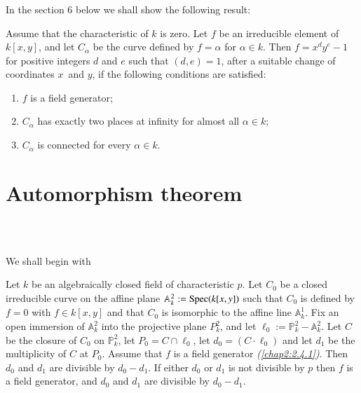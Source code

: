 \subsubsection{}\label{chap2:2.4.6}
In the section 6 below we shall show the following result:

Assume that the characteristic of $k$ is zero. Let $f$ be an
irreducible element of $k[x,y]$, and let $C_{\alpha}$ be the curve
defined by $f=\alpha$ for $\alpha\in k$. Then $f=x^{d}y^{e}-1$ for
positive integers $d$ and $e$ such that $(d,e)=1$, after a suitable
change of coordinates $x$\pageoriginale\ and $y$, if the following
conditions are satisfied:
\begin{enumerate}
\renewcommand{\labelenumi}{\theenumi$^{\circ}$}
\item $f$ is a field generator;

\item $C_{\alpha}$ has exactly two places at infinity for almost all
  $\alpha\in k$;

\item $C_{\alpha}$ is connected for every $\alpha\in k$.
\end{enumerate}

\section{Automorphism theorem}\label{chap2:sec3}\pageoriginale\

\subsection{}\label{chap2:3.1}
We shall begin with 

\begin{lemma*}[\cf Nagata {[43; p.\@ 21]} ]
Let $k$ be an algebraically closed field of characteristic $p$. Let
$C_{0}$ be a closed irreducible curve on the affine plane
$\mathbb{A}^{2}_{k}:=\operatorname{Spec}(k[x,y])$ such that $C_{0}$ is defined by
$f=0$ with $f\in k[x,y]$ and that $C_{0}$ is isomorphic to the affine
line $\mathbb{A}^{1}_{k}$. Fix an open immersion of
$\mathbb{A}^{2}_{k}$ into the projective plane $P^{2}_{k}$, and let
$\ell_{0}:=\mathbb{P}^{2}_{k}-\mathbb{A}^{2}_{k}$. Let $C$ be the
closure of $C_{0}$ on $\mathbb{P}^{2}_{k}$, let $P_{0}=C\cap
\ell_{0}$, let $d_{0}=(C\cdot\ell_{0})$ and let $d_{1}$ be the
multiplicity of $C$ at $P_{0}$. Assume that $f$ is a field generator
{\em (\cf \ref{chap2:2.4.1})}. Then $d_{0}$ and $d_{1}$ are divisible by
$d_{0}-d_{1}$. If either $d_{0}$ or $d_{1}$ is not divisible by $p$
then $f$ is a field generator, and $d_{0}$ and $d_{1}$ are divisible
by $d_{0}-d_{1}$.
\end{lemma*}

